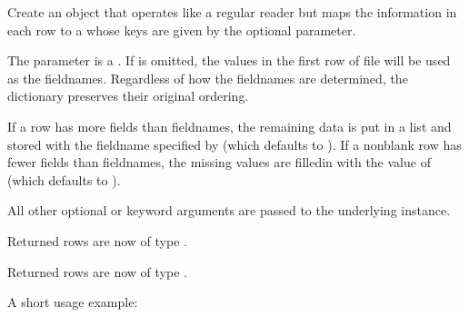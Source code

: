 \documentclass[letterpaper,10pt,english]{sphinxmanual}
\begin{document}
\begin{fulllineitems}
\label{\detokenize{csv:csv.DictReader}}
Create an object that operates like a regular reader but maps the
information in each row to a  whose keys are given by the
optional  parameter.

The  parameter is a .  If  is
omitted, the values in the first row of file  will be used as the
fieldnames.  Regardless of how the fieldnames are determined, the
dictionary preserves their original ordering.

If a row has more fields than fieldnames, the remaining data is put in a
list and stored with the fieldname specified by  (which defaults
to ).  If a non\sphinxhyphen{}blank row has fewer fields than fieldnames, the
missing values are filled\sphinxhyphen{}in with the value of  (which defaults
to ).

All other optional or keyword arguments are passed to the underlying
{\hyperref[\detokenize{csv:csv.reader}]{}} instance.

Returned rows are now of type .

Returned rows are now of type .

A short usage example:


\end{fulllineitems}
\end{document}

